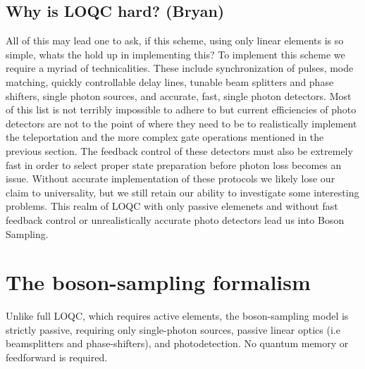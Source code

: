 \documentclass[aps,pra,twocolumn,amsmath,amssymb,nofootinbib,superscriptaddress]{revtex4}
\begin{document}
\subsection{Why is LOQC hard? (Bryan)}
All of this may lead one to ask, if this scheme, using only linear elements is so simple, whats the hold up in implementing this? To implement this scheme we require a myriad of technicalities. These include synchronization of pulses, mode matching, quickly controllable delay lines, tunable beam splitters and phase shifters, single photon sources, and accurate, fast, single photon detectors. Most of this list is not terribly impossible to adhere to but current efficiencies of photo detectors are not to the point of where they need to be to realistically implement the teleportation and the more complex gate operations mentioned in the previous section. The feedback control of these detectors must also be extremely fast in order to select proper state preparation before photon loss becomes an issue. Without accurate implementation of these protocols we likely lose our claim to universality, but we still retain our ability to investigate some interesting problems. This realm of LOQC with only passive elemenets and without fast feedback control or unrealistically accurate photo detectors lead us into Boson Sampling.

\section{The boson-sampling formalism}

Unlike full LOQC, which requires active elements, the boson-sampling model is strictly passive, requiring only single-photon sources, passive linear optics (i.e beamsplitters and phase-shifters), and photodetection. No quantum memory or feedforward is required.
\end{document}
